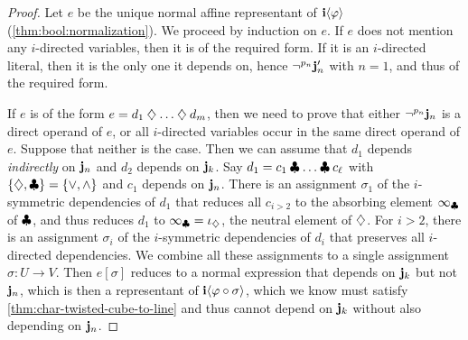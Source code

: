 \documentclass[a4paper]{memoir}
\begin{document}
\begin{proof}
	
	Let $e$ be the unique normal affine representant of $\mathbf{i} \langle \varphi \rangle$ (\cref{thm:bool:normalization}).
	We proceed by induction on $e$.
	If $e$ does not mention any $i$-directed variables, then it is of the required form.
	If it is an $i$-directed literal, then it is the only one it depends on, hence $\lnot^{p_n} \mathbf{j}_n'$ with $n=1$, and thus of the required form.
	
	If $e$ is of the form $e = d_1 \mathbin{\diamondsuit} \ldots \mathbin{\diamondsuit} d_m$, then we need to prove that either $\lnot^{p_n} \mathbf{j}_n$ is a direct operand of $e$, or all $i$-directed variables occur in the same direct operand of $e$.
	Suppose that neither is the case. Then we can assume that $d_1$ depends \emph{indirectly} on $\mathbf{j}_n$ and $d_2$ depends on $\mathbf{j}_k$.
	Say $d_1 = c_1 \mathbin{\clubsuit} \ldots \mathbin{\clubsuit} c_\ell$ with $\mathopen{}\left\{ {\mathbin{\diamondsuit}}, {\mathbin{\clubsuit}} \right\}\mathclose{} = \mathopen{}\left\{ {\vee}, {\wedge} \right\}\mathclose{}$ and $c_1$ depends on $\mathbf{j}_n$.
	There is an assignment $\sigma_1$ of the $i$-symmetric dependencies of $d_1$ that reduces all $c_{i > 2}$ to the absorbing element $\infty_{\mathbin{\clubsuit}}$ of $\mathbin{\clubsuit}$, and thus reduces $d_1$ to $\infty_{\mathbin{\clubsuit}} = \iota_{\mathbin{\diamondsuit}}$, the neutral element of $\mathbin{\diamondsuit}$.
	For $i > 2$, there is an assignment $\sigma_i$ of the $i$-symmetric dependencies of $d_i$ that preserves all $i$-directed dependencies.
	We combine all these assignments to a single assignment $\sigma : U \to V$. Then $e[\sigma]$ reduces to a normal expression that depends on $\mathbf{j}_k$ but not $\mathbf{j}_n$, which is then a representant of $\mathbf{i} \langle \varphi \circ \sigma \rangle$, which we know must satisfy \cref{thm:char-twisted-cube-to-line} and thus cannot depend on $\mathbf{j}_k$ without also depending on $\mathbf{j}_n$.
	

\end{proof}
\end{document}

